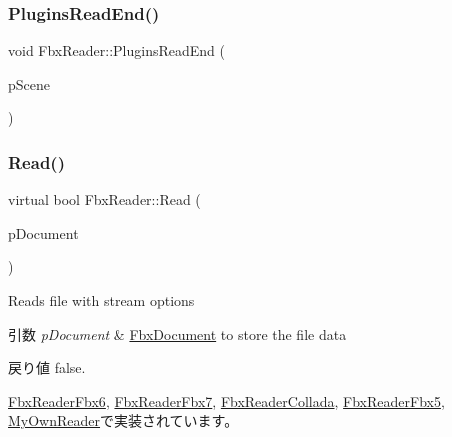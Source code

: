 \mbox{\label{class_fbx_reader_ab0213250ebf3b09c6f31ee1d2a610a07}} 
\subsubsection{\texorpdfstring{Plugins\+Read\+End()}{PluginsReadEnd()}}
{\footnotesize\ttfamily void Fbx\+Reader\+::\+Plugins\+Read\+End (\begin{DoxyParamCaption}\item[{\hyperlink{class_fbx_scene}{Fbx\+Scene} \&}]{p\+Scene }\end{DoxyParamCaption})\hspace{0.3cm}{\ttfamily [protected]}}

\mbox{\label{class_fbx_reader_a29941746acc73d7ffd2411a9be9d2525}} 
\subsubsection{\texorpdfstring{Read()}{Read()}}
{\footnotesize\ttfamily virtual bool Fbx\+Reader\+::\+Read (\begin{DoxyParamCaption}\item[{\hyperlink{class_fbx_document}{Fbx\+Document} $\ast$}]{p\+Document }\end{DoxyParamCaption})\hspace{0.3cm}{\ttfamily [pure virtual]}}

Reads file with stream options 
\begin{DoxyParams}{引数}
{\em p\+Document} & \hyperlink{class_fbx_document}{Fbx\+Document} to store the file data \\
\hline
\end{DoxyParams}
\begin{DoxyReturn}{戻り値}
{\ttfamily false}. 
\end{DoxyReturn}


\hyperlink{class_fbx_reader_fbx6_ab16aeaede33ca635a0493069aac4fbea}{Fbx\+Reader\+Fbx6}, \hyperlink{class_fbx_reader_fbx7_a037c53dbae903fd4aafbb942a563f759}{Fbx\+Reader\+Fbx7}, \hyperlink{class_fbx_reader_collada_afbffa96769d22d8e5df25c83d15bd8cb}{Fbx\+Reader\+Collada}, \hyperlink{class_fbx_reader_fbx5_aac75f44d42d473ac88a54c81ec5b1af6}{Fbx\+Reader\+Fbx5}, \hyperlink{class_my_own_reader_a0b742b5ba8aa552aa4968349a0068673}{My\+Own\+Reader}で実装されています。

